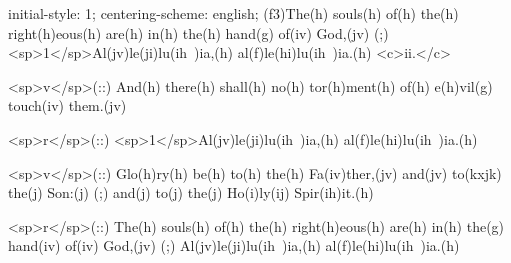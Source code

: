 initial-style: 1;
centering-scheme: english;
(f3)The(h) souls(h) of(h) the(h) right(h)eous(h) are(h) in(h) the(h) hand(g) of(iv) God,(jv) (;) <sp>1</sp>Al(jv)le(ji)lu(ih~)ia,(h) al(f)le(hi)lu(ih~)ia.(h) <c>ii.</c>

<sp>v</sp>(::) And(h) there(h) shall(h) no(h) tor(h)ment(h) of(h) e(h)vil(g) touch(iv) them.(jv)

<sp>r</sp>(::) <sp>1</sp>Al(jv)le(ji)lu(ih~)ia,(h) al(f)le(hi)lu(ih~)ia.(h)

<sp>v</sp>(::) Glo(h)ry(h) be(h) to(h) the(h) Fa(iv)ther,(jv) and(jv) to(kxjk) the(j) Son:(j) (;) and(j) to(j) the(j) Ho(i)ly(ij) Spir(ih)it.(h)

<sp>r</sp>(::) The(h) souls(h) of(h) the(h) right(h)eous(h) are(h) in(h) the(g) hand(iv) of(iv) God,(jv) (;) Al(jv)le(ji)lu(ih~)ia,(h) al(f)le(hi)lu(ih~)ia.(h)
